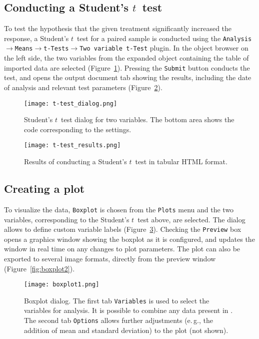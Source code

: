 \subsection[Conducting a Student's t-test]{Conducting a Student's $t$~test}
\label{sec:conducting_ttest}
To test the hypothesis that the given treatment significantly increased the response, a Student's
$t$~test for a paired sample is conducted using the
\texttt{Analysis$\rightarrow$Means$\rightarrow$t-Tests$\rightarrow$Two variable t-Test} plugin.
In the object browser on the left side, the two variables from the expanded
 object containing the table of imported data 
are selected (Figure~\ref{fig:t_test_dialog}). 
Pressing the \texttt{Submit} button conducts the test, and opens the output document tab
showing the results, including the date of analysis and relevant test parameters (Figure~\ref{fig:t_test_results}).

\begin{figure}[b!]
 \centering
 \texttt{[image: t-test\_dialog.png]}
 \caption{Student's $t$~test dialog for two variables. The bottom area shows the  code corresponding to the settings.}
 \label{fig:t_test_dialog}
\end{figure}

\begin{figure}[t!]
 \centering
 \texttt{[image: t-test\_results.png]}
 \caption{Results of conducting a Student's $t$~test in tabular HTML format.}
 \label{fig:t_test_results}
\end{figure}

\subsection{Creating a plot}
\label{sec:create_plot}
To visualize the data, \texttt{Boxplot} is chosen from the \texttt{Plots} menu
and the two variables, corresponding to the Student's $t$~test above, are selected.
The dialog allows to define custom variable labels (Figure~\ref{fig:boxplot1}).
Checking the \texttt{Preview} box opens a graphics window showing the boxplot as
it is configured, and updates the window in real time on any changes to plot parameters.
The plot can also be exported to several image formats, directly from the preview window (Figure~\ref{fig:boxplot2}).

\begin{figure}[b!]
 \centering
 \texttt{[image: boxplot1.png]}
 \caption{Boxplot dialog. The first tab \texttt{Variables} is used to select the variables for analysis. It is possible to
  combine any data present in . The second tab \texttt{Options} allows further adjustments (e.\,g., the addition of mean and standard deviation) to the plot (not shown).}
 \label{fig:boxplot1}
\end{figure}

